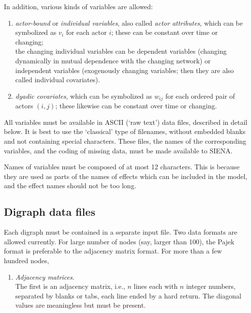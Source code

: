 \documentclass[a4paper,fleqn]{article}
\newcommand{\+}{\, + \,}
\newcommand{\si}{{\sf SIENA}}
\begin{document}
{In addition, various kinds of variables are allowed:

\begin{enumerate}
\item {\em actor-bound} or {\em individual variables},
      also called {\em actor attributes},
      which can be symbolized as $v_i$ for each actor $i$;
      these can be constant over time or changing; \\
      the changing individual variables can be dependent variables
      (changing dynamically in mutual dependence with the changing network)
      or independent variables (exogenously changing variables;
      then they are also called individual covariates).
\item {\em dyadic covariates}, which can be symbolized as $w_{ij}$
      for each ordered pair of actors $(i,j)$;
     these likewise can be constant over time or changing.
\end{enumerate}


All variables must be available in ASCII (`raw text') data files, described in
detail below. It is best to use the `classical' type of filenames, without embedded blanks
and not containing special characters.
These files, the names of the corresponding
variables, and the coding of missing data, must be made available
to \si.

Names of variables must be composed of at most 12 characters. This
is because they are used as parts of the names of effects which
can be included in the model, and the effect names should not be
too long.

\begin{screen}
\end{screen}
\subsection{Digraph data files}

Each digraph must be contained in a separate input file.  Two data formats are
allowed currently.  For large number of nodes (say, larger than 100), the Pajek
format is preferable to the adjacency matrix format.  For more than a few
hundred nodes,
\begin{enumerate}
\item \emph{Adjacency matrices}.\\
      The first is an adjacency matrix, i.e., $n$ lines each with $n$ integer
      numbers, separated by blanks or tabs, each line ended by a hard return.
      The diagonal values are meaningless but must be present.


\end{enumerate}}
\end{document}
